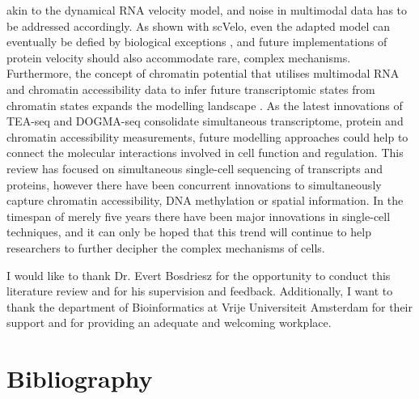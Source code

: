 \documentclass[times, twoside, watermark]{zHenriquesLab-StyleBioRxiv}
\begin{document}
akin to the dynamical RNA velocity model, and noise in multimodal data has to be addressed accordingly. As shown with scVelo, even the adapted model can eventually be defied by biological exceptions \cite{Bergen2021}, and future implementations of protein velocity should also accommodate rare, complex mechanisms. Furthermore, the concept of chromatin potential that utilises multimodal RNA and chromatin accessibility data to infer future transcriptomic states from chromatin states expands the modelling landscape \cite{Ma2020}. As the latest innovations of TEA-seq \cite{Swanson2021} and DOGMA-seq \cite{Mimitou2021} consolidate simultaneous transcriptome, protein and chromatin accessibility measurements, future modelling approaches could help to connect the molecular interactions involved in cell function and regulation. \newline This review has focused on simultaneous single-cell sequencing of transcripts and proteins, however there have been concurrent innovations to simultaneously capture chromatin accessibility, DNA methylation or spatial information. In the timespan of merely five years there have been major innovations in single-cell techniques, and it can only be hoped that this trend will continue to help researchers to further decipher the complex mechanisms of cells.

\begin{acknowledgements}
I would like to thank Dr. Evert Bosdriesz for the opportunity to conduct this literature review and for his supervision and feedback. Additionally, I want to thank the department of Bioinformatics at Vrije Universiteit Amsterdam for their support and for providing an adequate and welcoming workplace.
\end{acknowledgements}

\section*{Bibliography}


\onecolumn
\newpage


\end{document}
